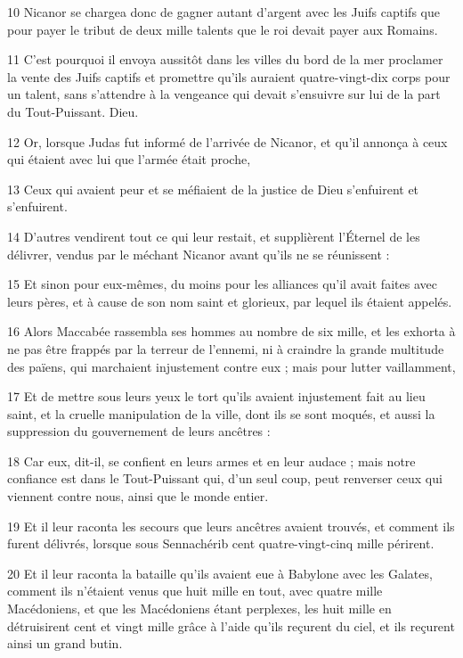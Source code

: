 \par 10 Nicanor se chargea donc de gagner autant d'argent avec les Juifs captifs que pour payer le tribut de deux mille talents que le roi devait payer aux Romains.
\par 11 C'est pourquoi il envoya aussitôt dans les villes du bord de la mer proclamer la vente des Juifs captifs et promettre qu'ils auraient quatre-vingt-dix corps pour un talent, sans s'attendre à la vengeance qui devait s'ensuivre sur lui de la part du Tout-Puissant. Dieu.
\par 12 Or, lorsque Judas fut informé de l'arrivée de Nicanor, et qu'il annonça à ceux qui étaient avec lui que l'armée était proche,
\par 13 Ceux qui avaient peur et se méfiaient de la justice de Dieu s'enfuirent et s'enfuirent.
\par 14 D'autres vendirent tout ce qui leur restait, et supplièrent l'Éternel de les délivrer, vendus par le méchant Nicanor avant qu'ils ne se réunissent :
\par 15 Et sinon pour eux-mêmes, du moins pour les alliances qu'il avait faites avec leurs pères, et à cause de son nom saint et glorieux, par lequel ils étaient appelés.
\par 16 Alors Maccabée rassembla ses hommes au nombre de six mille, et les exhorta à ne pas être frappés par la terreur de l'ennemi, ni à craindre la grande multitude des païens, qui marchaient injustement contre eux ; mais pour lutter vaillamment,
\par 17 Et de mettre sous leurs yeux le tort qu'ils avaient injustement fait au lieu saint, et la cruelle manipulation de la ville, dont ils se sont moqués, et aussi la suppression du gouvernement de leurs ancêtres :
\par 18 Car eux, dit-il, se confient en leurs armes et en leur audace ; mais notre confiance est dans le Tout-Puissant qui, d’un seul coup, peut renverser ceux qui viennent contre nous, ainsi que le monde entier.
\par 19 Et il leur raconta les secours que leurs ancêtres avaient trouvés, et comment ils furent délivrés, lorsque sous Sennachérib cent quatre-vingt-cinq mille périrent.
\par 20 Et il leur raconta la bataille qu'ils avaient eue à Babylone avec les Galates, comment ils n'étaient venus que huit mille en tout, avec quatre mille Macédoniens, et que les Macédoniens étant perplexes, les huit mille en détruisirent cent et vingt mille grâce à l'aide qu'ils reçurent du ciel, et ils reçurent ainsi un grand butin.
